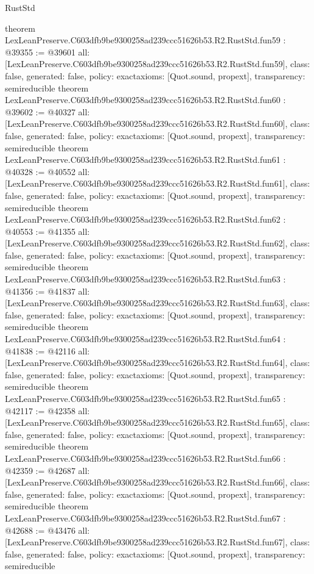\begin{lexlean}{RustStd}
\begin{coremodule}
{}
theorem LexLeanPreserve.C603dfb9be9300258ad239ccc51626b53.R2.RustStd.fun59 : @39355 := @39601 {
  all: [LexLeanPreserve.C603dfb9be9300258ad239ccc51626b53.R2.RustStd.fun59],
  class: false,
  generated: false,
  policy: exact{axioms: [Quot.sound, propext]},
  transparency: semireducible
}
theorem LexLeanPreserve.C603dfb9be9300258ad239ccc51626b53.R2.RustStd.fun60 : @39602 := @40327 {
  all: [LexLeanPreserve.C603dfb9be9300258ad239ccc51626b53.R2.RustStd.fun60],
  class: false,
  generated: false,
  policy: exact{axioms: [Quot.sound, propext]},
  transparency: semireducible
}
theorem LexLeanPreserve.C603dfb9be9300258ad239ccc51626b53.R2.RustStd.fun61 : @40328 := @40552 {
  all: [LexLeanPreserve.C603dfb9be9300258ad239ccc51626b53.R2.RustStd.fun61],
  class: false,
  generated: false,
  policy: exact{axioms: [Quot.sound, propext]},
  transparency: semireducible
}
theorem LexLeanPreserve.C603dfb9be9300258ad239ccc51626b53.R2.RustStd.fun62 : @40553 := @41355 {
  all: [LexLeanPreserve.C603dfb9be9300258ad239ccc51626b53.R2.RustStd.fun62],
  class: false,
  generated: false,
  policy: exact{axioms: [Quot.sound, propext]},
  transparency: semireducible
}
theorem LexLeanPreserve.C603dfb9be9300258ad239ccc51626b53.R2.RustStd.fun63 : @41356 := @41837 {
  all: [LexLeanPreserve.C603dfb9be9300258ad239ccc51626b53.R2.RustStd.fun63],
  class: false,
  generated: false,
  policy: exact{axioms: [Quot.sound, propext]},
  transparency: semireducible
}
theorem LexLeanPreserve.C603dfb9be9300258ad239ccc51626b53.R2.RustStd.fun64 : @41838 := @42116 {
  all: [LexLeanPreserve.C603dfb9be9300258ad239ccc51626b53.R2.RustStd.fun64],
  class: false,
  generated: false,
  policy: exact{axioms: [Quot.sound, propext]},
  transparency: semireducible
}
theorem LexLeanPreserve.C603dfb9be9300258ad239ccc51626b53.R2.RustStd.fun65 : @42117 := @42358 {
  all: [LexLeanPreserve.C603dfb9be9300258ad239ccc51626b53.R2.RustStd.fun65],
  class: false,
  generated: false,
  policy: exact{axioms: [Quot.sound, propext]},
  transparency: semireducible
}
theorem LexLeanPreserve.C603dfb9be9300258ad239ccc51626b53.R2.RustStd.fun66 : @42359 := @42687 {
  all: [LexLeanPreserve.C603dfb9be9300258ad239ccc51626b53.R2.RustStd.fun66],
  class: false,
  generated: false,
  policy: exact{axioms: [Quot.sound, propext]},
  transparency: semireducible
}
theorem LexLeanPreserve.C603dfb9be9300258ad239ccc51626b53.R2.RustStd.fun67 : @42688 := @43476 {
  all: [LexLeanPreserve.C603dfb9be9300258ad239ccc51626b53.R2.RustStd.fun67],
  class: false,
  generated: false,
  policy: exact{axioms: [Quot.sound, propext]},
  transparency: semireducible
}
\end{coremodule}
\end{lexlean}
